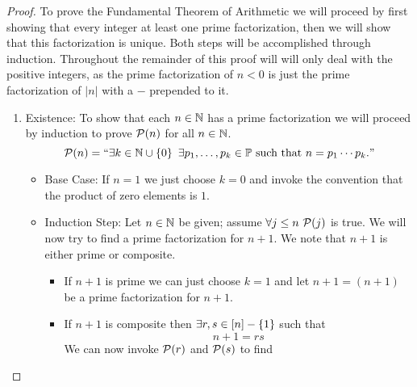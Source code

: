         \begin{proof}
            To prove the Fundamental Theorem of Arithmetic we will proceed by first showing
            that every integer at least one prime factorization, then we will show that this
            factorization is unique. Both steps will be accomplished through induction.
            Throughout the remainder of this proof will will only deal with the positive integers, as
            the prime factorization of $n < 0$ is just the prime factorization of $|n|$ with
            a $-$ prepended to it.
            \begin{enumerate}
                \item
                    Existence: To show that each $n \in \mathbb{N}$ has a prime factorization
                    we will proceed by induction to prove $\mathcal{P}(n)$ for all $n \in \mathbb{N}$.
                    \[
                        \mathcal{P}(n) = ``\exists k \in \mathbb{N} \cup \left\{0\right\} \ \exists p_1, \dots, p_k \in \mathbb{P}
                        \mbox{ such that } n = p_1 \cdots p_k."
                    \]
                    \begin{itemize}
                        \item
                            Base Case: If $n = 1$ we just choose $k = 0$ and invoke the
                            convention that the product of zero elements is $1$.
                        \item
                            Induction Step: Let $n \in \mathbb{N}$ be given; assume $\forall j \le n \ 
                            \inductive{P}{j}$ is true. We will now try to find a prime factorization
                            for $n + 1$. We note that $n + 1$ is either prime or composite.
                            \begin{itemize}
                                \item
                                    If $n + 1$ is prime we can just choose $k = 1$ and let $n + 1 = (n + 1)$
                                    be a prime factorization for $n + 1$.
                                \item
                                    If $n + 1$ is composite then
                                    $\exists r, s \in [n] - \left\{1\right\}$ such that 
                                    \[
                                        n + 1 = rs
                                    \]
                                    We can now invoke $\mathcal{P}(r)$ and $\mathcal{P}(s)$ to find

\end{itemize}
\end{itemize}
\end{enumerate}
\end{proof}
